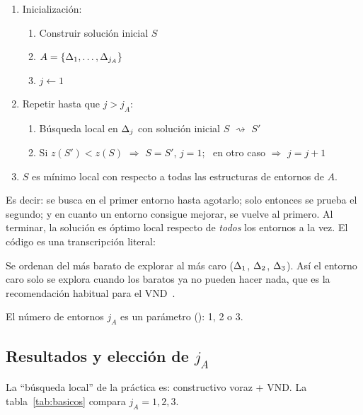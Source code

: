 \begin{apuntes}
\begin{enumerate}[label=\arabic*.,itemsep=0pt]
  \item Inicialización:
  \begin{enumerate}[label=1.\arabic*,itemsep=0pt]
    \item Construir solución inicial $S$
    \item $A=\{\Delta_{1},\dots,\Delta_{j_A}\}$
    \item $j\gets 1$
  \end{enumerate}
  \item Repetir hasta que $j>j_A$:
  \begin{enumerate}[label=2.\arabic*,itemsep=0pt]
    \item Búsqueda local en $\Delta_{j}$ con solución inicial $S$ $\rightsquigarrow$ $S'$
    \item Si $z(S')<z(S)$ $\Rightarrow$ $S=S'$, $j=1$; \ en otro caso $\Rightarrow$ $j=j+1$
  \end{enumerate}
  \item $S$ es mínimo local con respecto a todas las estructuras de entornos de $A$.
\end{enumerate}
\end{apuntes}

Es decir: se busca en el primer entorno hasta agotarlo; solo entonces se prueba el segundo;
y en cuanto un entorno consigue mejorar, se vuelve al primero. Al terminar, la solución es
óptimo local respecto de \emph{todos} los entornos a la vez. El código es una transcripción
literal:


\begin{decision}
Se ordenan del más barato de explorar al más caro ($\Delta_{1}$, $\Delta_{2}$, $\Delta_{3}$). Así el entorno
caro solo se explora cuando los baratos ya no pueden hacer nada, que es la recomendación
habitual para el VND~\cite{vnsbasics}.
\end{decision}

El número de entornos $j_A$ es un parámetro (): 1, 2 o 3.

\subsection{Resultados y elección de \texorpdfstring{$j_A$}{jA}}

La ``búsqueda local'' de la práctica es: constructivo voraz + VND. La tabla~\ref{tab:basicos}
compara $j_A=1,2,3$.

